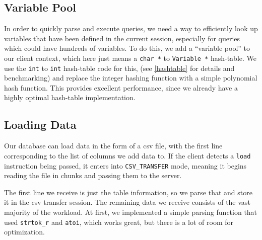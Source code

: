 \documentclass[a4paper, 12pt]{article}
\begin{document}
\subsection{Variable Pool}

In order to quickly parse and execute queries, we need a way to efficiently look up variables that have been defined in the current session, especially for queries which could have hundreds of variables. To do this, we add a ``variable pool'' to our client context, which here just means a \texttt{char~*} to \texttt{Variable~*} hash-table. We use the \texttt{int} to \texttt{int} hash-table code for this, (see \ref{hashtable} for details and benchmarking) and replace the integer hashing function with a simple polynomial hash function. This provides excellent performance, since we already have a highly optimal hash-table implementation.

\subsection{Loading Data}

Our database can load data in the form of a csv file, with the first line corresponding to the list of columns we add data to. If the client detects a \texttt{load} instruction being passed, it enters into \texttt{CSV\_TRANSFER} mode, meaning it begins reading the file in chunks and passing them to the server.

\medskip
The first line we receive is just the table information, so we parse that and store it in the csv transfer session. The remaining data we receive consists of the vast majority of the workload. At first, we implemented a simple parsing function that used \texttt{strtok\_r} and \texttt{atoi}, which works great, but there is a lot of room for optimization.
\end{document}
